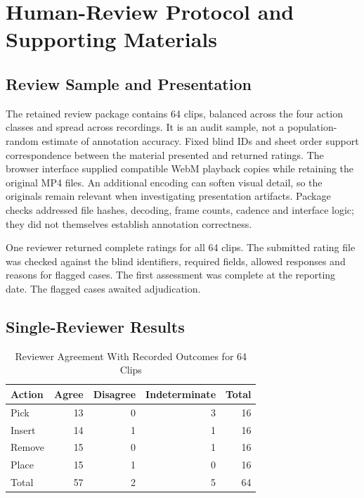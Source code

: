 \chapter{Human-Review Protocol and Supporting Materials}
\label{app:human-review}

\section{Review Sample and Presentation}

The retained review package contains 64 clips, balanced across the four action classes and spread across recordings. It is an audit sample, not a population-random estimate of annotation accuracy. Fixed blind IDs and sheet order support correspondence between the material presented and returned ratings. The browser interface supplied compatible WebM playback copies while retaining the original MP4 files. An additional encoding can soften visual detail, so the originals remain relevant when investigating presentation artifacts. Package checks addressed file hashes, decoding, frame counts, cadence and interface logic; they did not themselves establish annotation correctness.

One reviewer returned complete ratings for all 64 clips. The submitted rating file was checked against the blind identifiers, required fields, allowed responses and reasons for flagged cases. The first assessment was complete at the reporting date. The flagged cases awaited adjudication.

\section{Single-Reviewer Results}

\begin{table}[htbp]
\caption{Reviewer Agreement With Recorded Outcomes for 64 Clips}\label{tab:human-review-outcomes}
\centering

\begin{tabular}{lrrrr}
\toprule Action & Agree & Disagree & Indeterminate & Total \\
\midrule
Pick &13&0&3&16\\
Insert &14&1&1&16\\
Remove &15&0&1&16\\
Place &15&1&0&16\\
\midrule
Total &57&2&5&64\\
\bottomrule
\end{tabular}
\end{table}

